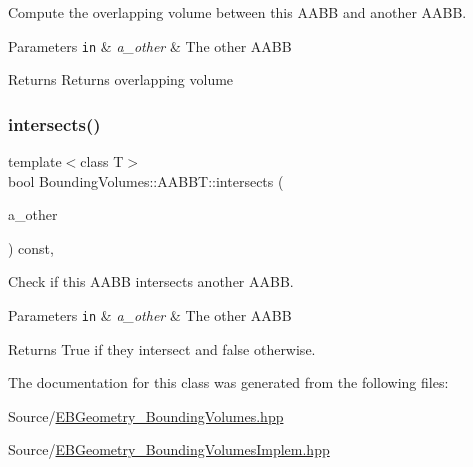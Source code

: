 Compute the overlapping volume between this A\+A\+BB and another A\+A\+BB. 


\begin{DoxyParams}[1]{Parameters}
\mbox{\tt in}  & {\em a\+\_\+other} & The other A\+A\+BB \\
\hline
\end{DoxyParams}
\begin{DoxyReturn}{Returns}
Returns overlapping volume 
\end{DoxyReturn}
\mbox{\label{classEBGeometry_1_1BoundingVolumes_1_1AABBT_a15e8b77c18d77e1da267b448e6389aff}} 
\subsubsection{\texorpdfstring{intersects()}{intersects()}}
{\footnotesize\ttfamily template$<$class T$>$ \\
bool Bounding\+Volumes\+::\+A\+A\+B\+B\+T\+::intersects (\begin{DoxyParamCaption}\item[{const \hyperlink{classEBGeometry_1_1BoundingVolumes_1_1AABBT}{A\+A\+B\+BT}$<$ T $>$ \&}]{a\+\_\+other }\end{DoxyParamCaption}) const\hspace{0.3cm}{\ttfamily [inline]}, {\ttfamily [noexcept]}}



Check if this A\+A\+BB intersects another A\+A\+BB. 


\begin{DoxyParams}[1]{Parameters}
\mbox{\tt in}  & {\em a\+\_\+other} & The other A\+A\+BB \\
\hline
\end{DoxyParams}
\begin{DoxyReturn}{Returns}
True if they intersect and false otherwise. 
\end{DoxyReturn}


The documentation for this class was generated from the following files\+:\begin{DoxyCompactItemize}
\item 
Source/\hyperlink{EBGeometry__BoundingVolumes_8hpp}{E\+B\+Geometry\+\_\+\+Bounding\+Volumes.\+hpp}\item 
Source/\hyperlink{EBGeometry__BoundingVolumesImplem_8hpp}{E\+B\+Geometry\+\_\+\+Bounding\+Volumes\+Implem.\+hpp}\end{DoxyCompactItemize}
